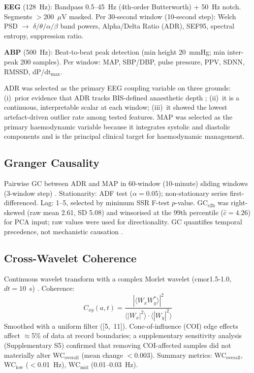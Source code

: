 \documentclass[fleqn,10pt,lineno]{wlpeerj}
\begin{document}
\textbf{EEG} (128~Hz): Bandpass 0.5--45~Hz (4th-order Butterworth) + 50~Hz notch. Segments
$>$200~$\mu$V masked. Per 30-second window (10-second step): Welch PSD $\to$
$\delta/\theta/\alpha/\beta$ band powers, Alpha/Delta Ratio (ADR), SEF95, spectral entropy,
suppression ratio.

\textbf{ABP} (500~Hz): Beat-to-beat peak detection (min height 20~mmHg; min inter-peak 200
samples). Per window: MAP, SBP/DBP, pulse pressure, PPV, SDNN, RMSSD, dP/dt$_\text{max}$.

ADR was selected as the primary EEG coupling variable on three grounds: (i)~prior evidence
that ADR tracks BIS-defined anaesthetic depth \citep{bruhn2000,akeju2014}; (ii)~it is a
continuous, interpretable scalar at each window; (iii)~it showed the lowest artefact-driven
outlier rate among tested features. MAP was selected as the primary haemodynamic variable
because it integrates systolic and diastolic components and is the principal clinical target
for haemodynamic management.

\subsection{Granger Causality}

Pairwise GC between ADR and MAP in 60-window (10-minute) sliding windows (3-window step)
\citep{granger1969,barnett2014}. Stationarity: ADF test ($\alpha = 0.05$); non-stationary
series first-differenced. Lag: 1--5, selected by minimum SSR F-test $p$-value. GC$_\text{e2h}$
was right-skewed (raw mean 2.61, SD 5.08) and winsorised at the 99th percentile
($\hat{c} = 4.26$) for PCA input; raw values were used for directionality. GC quantifies
temporal precedence, not mechanistic causation \citep{granger1969}.

\subsection{Cross-Wavelet Coherence}

Continuous wavelet transform with a complex Morlet wavelet (cmor1.5-1.0, $dt = 10$~s)
\citep{torrence1998}. Coherence:
\begin{equation}
C_{xy}(a,t) = \frac{|\langle W_x W_y^* \rangle|^2}
  {\langle |W_x|^2 \rangle \cdot \langle |W_y|^2 \rangle}
\end{equation}
Smoothed with a uniform filter ([5,~11]). Cone-of-influence (COI) edge effects affect
$\approx$5\% of data at record boundaries; a supplementary sensitivity analysis
(Supplementary S5) confirmed that removing COI-affected samples did not materially alter
WC$_\text{overall}$ (mean change $<$0.003). Summary metrics: WC$_\text{overall}$,
WC$_\text{low}$ ($<$0.01~Hz), WC$_\text{mid}$ (0.01--0.03~Hz).
\end{document}
